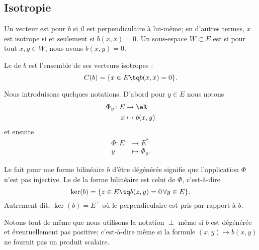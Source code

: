 \subsection{Isotropie}

\begin{definition}[Isotropie]   \label{DefVKMnUEM}
	Un vecteur est  pour \( b\) si il est perpendiculaire à lui-même; en d'autres termes, \( x\) est isotrope si et seulement si \( b(x,x)=0\). Un sous-espace \( W\subset E\) est  si pour tout \( x,y\in W\), nous avons \( b(x,y)=0\).

	Le  de \( b\) est l'ensemble de ses vecteurs isotropes :
	\begin{equation}
		C(b)=\{ x\in E\tq b(x,x)=0 \}.
	\end{equation}
\end{definition}
Nous introduisons quelques notations. D'abord pour \( y\in E\) nous notons
\begin{equation}
	\begin{aligned}
		\Phi_y\colon E & \to \eR        \\
		x              & \mapsto b(x,y)
	\end{aligned}
\end{equation}
et ensuite
\begin{equation}
	\begin{aligned}
		\Phi\colon E & \to E^*         \\
		y            & \mapsto \Phi_y.
	\end{aligned}
\end{equation}
\begin{definition}
	Le fait pour une forme bilinéaire \( b\) d'être dégénérée signifie que l'application \( \Phi\) n'est pas injective. Le  de la forme bilinéaire est celui de \( \Phi\), c'est-à-dire
	\begin{equation}
		\ker(b)=\{ z\in E\tq b(z,y)=0\,\forall y\in E \}.
	\end{equation}
	Autrement dit, \( \ker(b)=E^{\perp}\) où le perpendiculaire est pris par rapport à \( b\).
\end{definition}
Notons tout de même que nous utilisons la notation \( \perp\) même si \( b\) est dégénérée et éventuellement pas positive; c'est-à-dire même si la formule \( (x,y)\mapsto b(x,y)\) ne fournit pas un produit scalaire.


